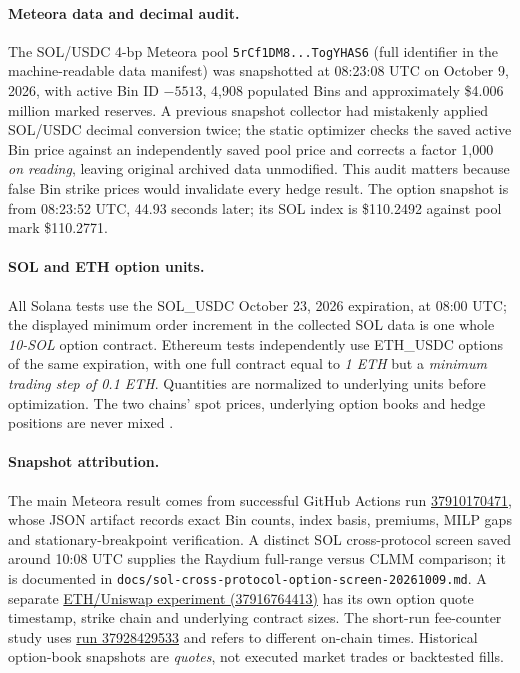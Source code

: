 \paragraph{Meteora data and decimal audit.}
The SOL/USDC 4-bp Meteora pool
\texttt{5rCf1DM8...TogYHAS6} (full identifier in the machine-readable data manifest)
was snapshotted at 08:23:08 UTC on October 9, 2026, with active Bin ID $-5513$, 4,908 populated Bins and approximately \$4.006 million marked reserves. A previous snapshot collector had mistakenly applied SOL/USDC decimal conversion twice; the static optimizer checks the saved active Bin price against an independently saved pool price and corrects a factor 1,000 \emph{on reading}, leaving original archived data unmodified. This audit matters because false Bin strike prices would invalidate every hedge result. The option snapshot is from 08:23:52 UTC, 44.93 seconds later; its SOL index is \$110.2492 against pool mark \$110.2771.

\paragraph{SOL and ETH option units.}
All Solana tests use the SOL\_USDC October 23, 2026 expiration, at 08:00 UTC; the displayed minimum order increment in the collected SOL data is one whole \emph{10-SOL} option contract. Ethereum tests independently use ETH\_USDC options of the same expiration, with one full contract equal to \emph{1 ETH} but a \emph{minimum trading step of 0.1 ETH}. Quantities are normalized to underlying units before optimization. The two chains' spot prices, underlying option books and hedge positions are never mixed \cite{deribitlinear}.

\paragraph{Snapshot attribution.}
The main Meteora result comes from successful GitHub Actions run
\href{https://github.com/evaristebernhard/arbitage/actions/runs/37910170471}{37910170471}, whose JSON artifact records exact Bin counts, index basis, premiums, MILP gaps and stationary-breakpoint verification. A distinct SOL cross-protocol screen saved around 10:08 UTC supplies the Raydium full-range versus CLMM comparison; it is documented in \texttt{docs/sol-cross-protocol-option-screen-20261009.md}. A separate
\href{https://github.com/evaristebernhard/arbitage/actions/runs/37916764413}{ETH/Uniswap experiment (37916764413)}
has its own option quote timestamp, strike chain and underlying contract sizes. The short-run fee-counter study uses
\href{https://github.com/evaristebernhard/arbitage/actions/runs/37928429533}{run 37928429533} and refers to different on-chain times. Historical option-book snapshots are \emph{quotes}, not executed market trades or backtested fills.
